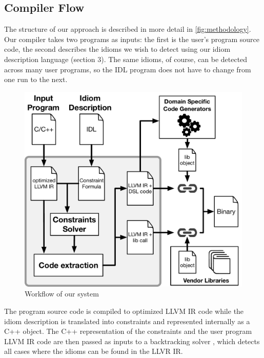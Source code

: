 \subsection{Compiler Flow}

    The structure of our approach is described in more detail in
    \autoref{fig:methodology}.
    Our compiler takes two programs as inputs: the first is the user's program
    source code, the second describes the idioms we wish to detect using our
    idiom description language (section 3).
    The same idioms, of course, can be detected across many user programs, so
    the IDL program does not have to change from one run to the next.

\begin{figure}[t]
    \centering
    \includegraphics[width=\linewidth]{figures/compiler_flow.pdf}
    \caption{Workflow of our system}
    \label{fig:methodology}
    \vspace{-0.5em}
\end{figure}

    The program source code is compiled to optimized LLVM IR code  while the
    idiom description is translated into constraints and represented
    internally as a C++ object.
    The C++ representation of the constraints and the user program LLVM IR code
    are then passed as inputs to a backtracking solver
    \cite{ginsbach2017discovery}, which detects all cases where the idioms can
    be found in the LLVR IR.

